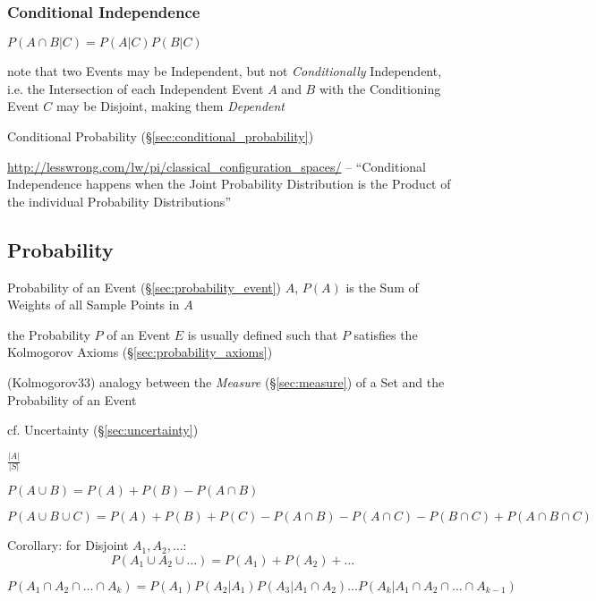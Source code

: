 \subsubsection{Conditional Independence}\label{sec:conditional_independence}

$P(A \cap B | C) = P(A|C)P(B|C)$

note that two Events may be Independent, but not \emph{Conditionally}
Independent, i.e. the Intersection of each Independent Event $A$ and $B$ with
the Conditioning Event $C$ may be Disjoint, making them \emph{Dependent}

\fist Conditional Probability (\S\ref{sec:conditional_probability})

\url{http://lesswrong.com/lw/pi/classical_configuration_spaces/}
-- ``Conditional Independence happens when the Joint Probability Distribution
is the Product of the individual Probability Distributions''



\subsection{Probability}\label{sec:probability}

Probability of an Event (\S\ref{sec:probability_event}) $A$, $P(A)$ is the Sum
of Weights of all Sample Points in $A$

the Probability $P$ of an Event $E$ is usually defined such that $P$ satisfies
the Kolmogorov Axioms (\S\ref{sec:probability_axioms})

(Kolmogorov33) analogy between the \emph{Measure} (\S\ref{sec:measure}) of a Set
and the Probability of an Event

cf. Uncertainty (\S\ref{sec:uncertainty})

$\frac{|A|}{|S|}$

$P(A \cup B) = P(A) + P(B) - P(A \cap B)$

$P(A \cup B \cup C) = P(A) + P(B) + P(C) - P(A \cap B) - P(A \cap C) -
P(B \cap C) + P(A \cap B \cap C)$

Corollary: for Disjoint $A_1, A_2, \ldots$:
\[
  P(A_1 \cup A_2 \cup \ldots) = P(A_1) + P(A_2) + \ldots
\]

$P(A_1 \cap A_2 \cap \ldots \cap A_k) = P(A_1) P(A_2 | A_1) P(A_3 |
A_1 \cap A_2) \ldots P(A_k | A_1 \cap A_2 \cap \ldots \cap A_{k-1})$

